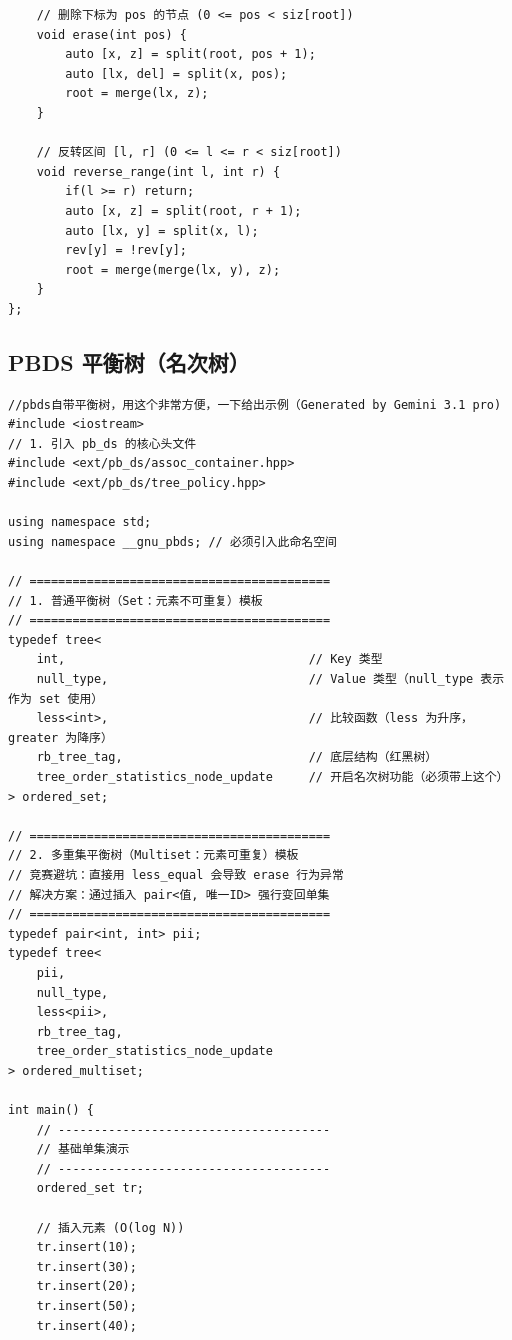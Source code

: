 \begin{lstlisting}
    // 删除下标为 pos 的节点 (0 <= pos < siz[root])
    void erase(int pos) {
        auto [x, z] = split(root, pos + 1); 
        auto [lx, del] = split(x, pos);    
        root = merge(lx, z); 
    }

    // 反转区间 [l, r] (0 <= l <= r < siz[root])
    void reverse_range(int l, int r) {
        if(l >= r) return;
        auto [x, z] = split(root, r + 1); 
        auto [lx, y] = split(x, l);       
        rev[y] = !rev[y]; 
        root = merge(merge(lx, y), z);
    }
};
\end{lstlisting}

\subsection{PBDS 平衡树（名次树）}

\begin{lstlisting}
//pbds自带平衡树，用这个非常方便，一下给出示例（Generated by Gemini 3.1 pro)
#include <iostream>
// 1. 引入 pb_ds 的核心头文件
#include <ext/pb_ds/assoc_container.hpp>
#include <ext/pb_ds/tree_policy.hpp>

using namespace std;
using namespace __gnu_pbds; // 必须引入此命名空间

// ==========================================
// 1. 普通平衡树（Set：元素不可重复）模板
// ==========================================
typedef tree<
    int,                                  // Key 类型
    null_type,                            // Value 类型（null_type 表示作为 set 使用）
    less<int>,                            // 比较函数（less 为升序，greater 为降序）
    rb_tree_tag,                          // 底层结构（红黑树）
    tree_order_statistics_node_update     // 开启名次树功能（必须带上这个）
> ordered_set;

// ==========================================
// 2. 多重集平衡树（Multiset：元素可重复）模板
// 竞赛避坑：直接用 less_equal 会导致 erase 行为异常
// 解决方案：通过插入 pair<值, 唯一ID> 强行变回单集
// ==========================================
typedef pair<int, int> pii;
typedef tree<
    pii, 
    null_type, 
    less<pii>, 
    rb_tree_tag, 
    tree_order_statistics_node_update
> ordered_multiset;

int main() {
    // --------------------------------------
    // 基础单集演示
    // --------------------------------------
    ordered_set tr;
    
    // 插入元素 (O(log N))
    tr.insert(10);
    tr.insert(30);
    tr.insert(20);
    tr.insert(50);
    tr.insert(40);


\end{lstlisting}
